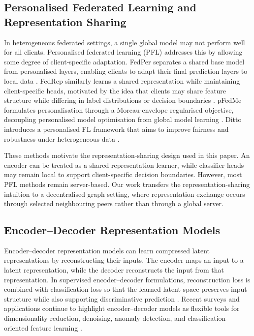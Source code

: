 \documentclass[conference]{IEEEtran}
\begin{document}
\subsection{Personalised Federated Learning and Representation Sharing}
\label{subsec:personalised-federated-learning-and-representation}
In heterogeneous federated settings, a single global model may not perform well for all clients. Personalised federated learning (PFL) addresses this by allowing some degree of client-specific adaptation. FedPer separates a shared base model from personalised layers, enabling clients to adapt their final prediction layers to local data \cite{arivazhagan2019fedper}. FedRep similarly learns a shared representation while maintaining client-specific heads, motivated by the idea that clients may share feature structure while differing in label distributions or decision boundaries \cite{collins2021exploiting}. pFedMe formulates personalisation through a Moreau-envelope regularised objective, decoupling personalised model optimisation from global model learning \cite{dinh2020pfedme}. Ditto introduces a personalised FL framework that aims to improve fairness and robustness under heterogeneous data \cite{li2021ditto}.

These methods motivate the representation-sharing design used in this paper. An encoder can be treated as a shared representation learner, while classifier heads may remain local to support client-specific decision boundaries. However, most PFL methods remain server-based. Our work transfers the representation-sharing intuition to a decentralised graph setting, where representation exchange occurs through selected neighbouring peers rather than through a global server.

\subsection{Encoder--Decoder Representation Models}
\label{subsec:encoder-decoder-representation-models}
Encoder--decoder representation models can learn compressed latent representations by reconstructing their inputs. The encoder maps an input to a latent representation, while the decoder reconstructs the input from that representation. In supervised encoder--decoder formulations, reconstruction loss is combined with classification loss so that the learned latent space preserves input structure while also supporting discriminative prediction \cite{le2018supervised}. Recent surveys and applications continue to highlight encoder--decoder models as flexible tools for dimensionality reduction, denoising, anomaly detection, and classification-oriented feature learning \cite{chen2023auto,gille2022semi}.
\end{document}
